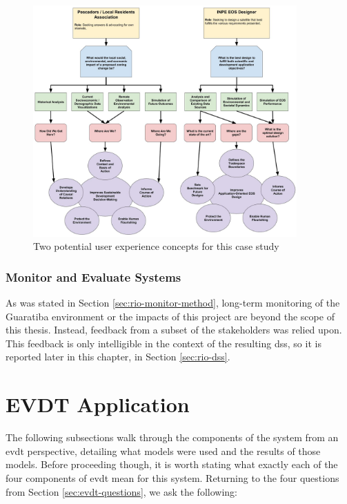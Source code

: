 \begin{figure}[t] 
\centering
\includegraphics[width=0.9\textwidth]{Figures/chap4/concept_flow.jpg}
\caption[Potential user experience concepts for the Rio de Janeiro case study]{Two potential user experience concepts for this case study}
\label{fig:concept_flow}
\end{figure}

\subsubsection{Monitor and Evaluate Systems}

As was stated in Section \ref{sec:rio-monitor-method}, long-term monitoring of the Guaratiba environment or the impacts of this project are beyond the scope of this thesis. Instead, feedback from a subset of the stakeholders was relied upon. This feedback is only intelligible in the context of the resulting \ac{dss}, so it is reported later in this chapter, in Section \ref{sec:rio-dss}.

\newpage

\section{EVDT Application} \label{sec:rio-evdt}

The following subsections walk through the components of the system from an \acf{evdt} perspective, detailing what models were used and the results of those models. Before proceeding though, it is worth stating what exactly each of the four components of \ac{evdt} mean for this system. Returning to the four questions from Section \ref{sec:evdt-questions}, we ask the following:

